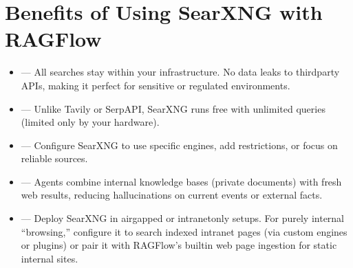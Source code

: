 \documentclass[letterpaper,10pt,english]{sphinxmanual}
\begin{document}
\section{Benefits of Using SearXNG with RAGFlow}
\label{\detokenize{searxng:benefits-of-using-searxng-with-ragflow}}\begin{itemize}
\item {} 
\sphinxAtStartPar
{} — All searches stay within your
infrastructure. No data leaks to third\sphinxhyphen{}party APIs, making it perfect
for sensitive or regulated environments.

\item {} 
\sphinxAtStartPar
{} — Unlike Tavily or SerpAPI, SearXNG runs
free with unlimited queries (limited only by your hardware).

\item {} 
\sphinxAtStartPar
{} — Configure SearXNG to use specific
engines, add restrictions, or focus on reliable sources.

\item {} 
\sphinxAtStartPar
{} — Agents combine internal knowledge
bases (private documents) with fresh web results, reducing
hallucinations on current events or external facts.

\item {} 
\sphinxAtStartPar
{} — Deploy SearXNG in air\sphinxhyphen{}gapped or
intranet\sphinxhyphen{}only setups. For purely internal “browsing,” configure it to
search indexed intranet pages (via custom engines or plugins) or pair
it with RAGFlow’s built\sphinxhyphen{}in web page ingestion for static internal
sites.

\end{itemize}
\end{document}
